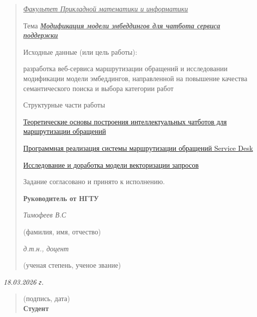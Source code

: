 \begin{quote}
\emph{\ul{Факультет Прикладной математики и информатики}}

Тема \emph{\textbf{\ul{Модификация модели эмбеддингов для чатбота
сервиса поддержки}}}

Исходные данные (или цель работы):

разработка веб-сервиса маршрутизации обращений и исследовании
модификации модели эмбеддингов, направленной на повышение качества
семантического поиска и выбора категории работ

Структурные части работы

\protect\hyperlink{ux442ux435ux43eux440ux435ux442ux438ux447ux435ux441ux43aux438ux435-ux43eux441ux43dux43eux432ux44b-ux43fux43eux441ux442ux440ux43eux435ux43dux438ux44f-ux438ux43dux442ux435ux43bux43bux435ux43aux442ux443ux430ux43bux44cux43dux44bux445-ux447ux430ux442ux431ux43eux442ux43eux432-ux434ux43bux44f-ux43cux430ux440ux448ux440ux443ux442ux438ux437ux430ux446ux438ux438-ux43eux431ux440ux430ux449ux435ux43dux438ux439}{Теоретические
основы построения интеллектуальных чатботов для маршрутизации обращений}

\protect\hyperlink{ux43fux440ux43eux433ux440ux430ux43cux43cux43dux430ux44f-ux440ux435ux430ux43bux438ux437ux430ux446ux438ux44f-ux441ux438ux441ux442ux435ux43cux44b-ux43cux430ux440ux448ux440ux443ux442ux438ux437ux430ux446ux438ux438-ux43eux431ux440ux430ux449ux435ux43dux438ux439-service-desk}{Программная
реализация системы маршрутизации обращений Service Desk}

\protect\hyperlink{ux438ux441ux441ux43bux435ux434ux43eux432ux430ux43dux438ux435-ux438-ux434ux43eux440ux430ux431ux43eux442ux43aux430-ux43cux43eux434ux435ux43bux438-ux432ux435ux43aux442ux43eux440ux438ux437ux430ux446ux438ux438-ux437ux430ux43fux440ux43eux441ux43eux432}{Исследование
и доработка модели векторизации запросов}

Задание согласовано и принято к исполнению.

\textbf{Руководитель от НГТУ}

\emph{Тимофеев В.С}

(фамилия, имя, отчество)

\emph{д.т.н., доцент}

(ученая степень, ученое звание)
\end{quote}

\emph{18.03.2026 г.}

\begin{quote}
(подпись, дата)\\
\textbf{Студент}
\end{quote}

